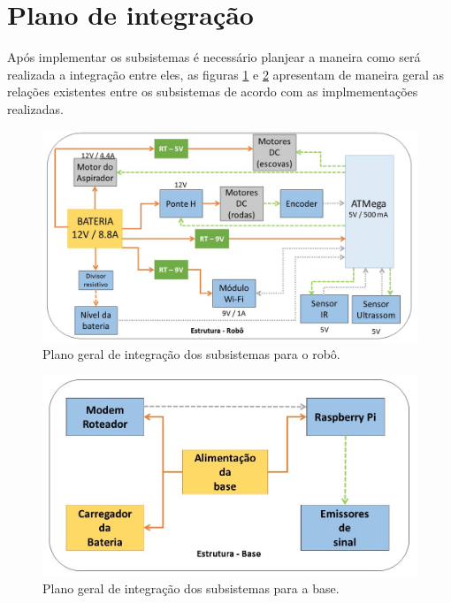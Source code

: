 \section{Plano de integração} %
\label{sec:plano_de_integração_e_validação}
	Após implementar os subsistemas é necessário planjear a maneira como será realizada a integração entre eles, as figuras \ref{img:integração_robô} e \ref{img:integração_base} apresentam de maneira geral as relações existentes entre os subsistemas de acordo com as implmementações realizadas.

	\begin{figure}[H]
   		\centering
   		\includegraphics[scale=0.48]{figuras/plano_integracao_robo.jpg}
   		\caption{Plano geral de integração dos subsistemas para o robô.}
   		\label{img:integração_robô}
   	\end{figure}

   	\begin{figure}[H]
   		\centering
   		\includegraphics[scale=0.5]{figuras/plano_integracao_base.jpg}
   		\caption{Plano geral de integração dos subsistemas para a base.}
   		\label{img:integração_base}
   	\end{figure}

